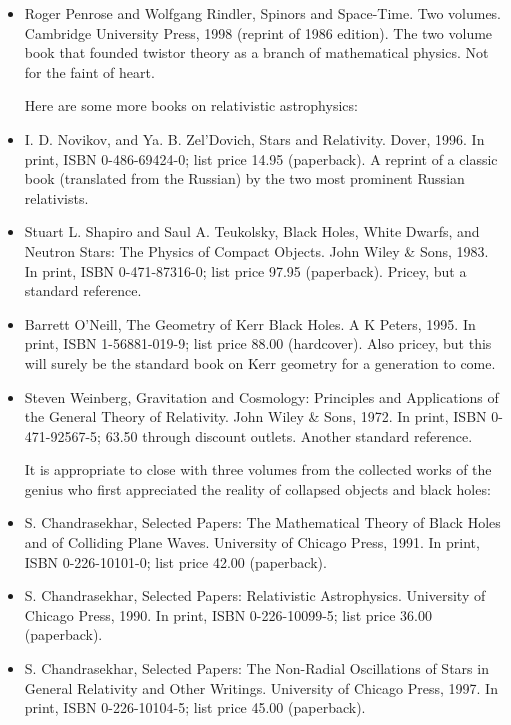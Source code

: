 \documentclass[10pt,a4paper]{book}
\theoremstyle{definition}
\begin{document}
\begin{itemize}
\item Roger Penrose and Wolfgang Rindler,
Spinors and Space-Time.  Two volumes.
Cambridge University Press, 1998 (reprint of 1986 edition).
The two volume book that founded twistor theory as a branch of mathematical physics.  Not for the faint of heart.

Here are some more books on relativistic astrophysics:

\item I. D. Novikov, and Ya. B. Zel'Dovich,
Stars and Relativity.
Dover, 1996.
In print, ISBN 0-486-69424-0; list price 14.95 (paperback).
A reprint of a classic book (translated from the Russian) by the two most prominent Russian relativists.

\item Stuart L. Shapiro and Saul A. Teukolsky,
Black Holes, White Dwarfs, and Neutron Stars: The Physics of Compact Objects.
John Wiley \& Sons, 1983.
In print, ISBN 0-471-87316-0; list price 97.95 (paperback).
Pricey, but a standard reference.

\item Barrett O'Neill,
The Geometry of Kerr Black Holes.
A K Peters, 1995.
In print, ISBN 1-56881-019-9; list price 88.00 (hardcover).
Also pricey, but this will surely be the standard book on Kerr geometry for a generation to come.

\item Steven Weinberg,
Gravitation and Cosmology: Principles and Applications of the General Theory of Relativity.
John Wiley \& Sons, 1972.
In print, ISBN 0-471-92567-5; 63.50 through discount outlets.
Another standard reference.

It is appropriate to close with three volumes from the collected works of the genius who first appreciated the reality of collapsed objects and black holes:

\item S. Chandrasekhar,
Selected Papers: The Mathematical Theory of Black Holes and of Colliding Plane Waves.
University of Chicago Press, 1991.
In print, ISBN 0-226-10101-0; list price 42.00 (paperback).

\item S. Chandrasekhar,
Selected Papers: Relativistic Astrophysics.
University of Chicago Press, 1990.
In print, ISBN 0-226-10099-5; list price 36.00 (paperback).

\item S. Chandrasekhar,
Selected Papers: The Non-Radial Oscillations of Stars in General Relativity and Other Writings.
University of Chicago Press, 1997.
In print, ISBN 0-226-10104-5; list price 45.00 (paperback).
\end{itemize}
\end{document}
